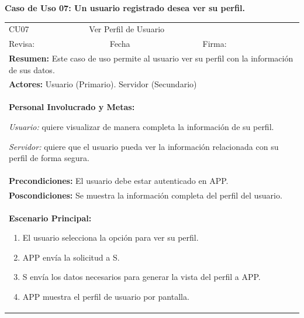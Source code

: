 		\textbf{Caso de Uso 07: Un usuario registrado desea ver su perfil.}
			\begin{longtable}{|l|p{5.5cm}|l|p{2cm}|l|p{1.9cm}|} \hline
				\cellcolor{grisOscuro} CU07 & \multicolumn{4}{|l|}{  \cellcolor{grisOscuro} Ver Perfil de Usuario} &  \cellcolor{grisClaro}\multirow{2}{1cm}{} \\ \cline{1-5}
				\cellcolor{grisOscuro} Revisa: &  \cellcolor{grisClaro} &  \cellcolor{grisOscuro} Fecha &  \cellcolor{grisClaro} &  \cellcolor{grisOscuro} Firma: & \cellcolor{grisClaro} \\ \hline
				\multicolumn{6}{|p{15cm}|}{ \textbf{Resumen: } Este caso de uso permite al usuario ver su perfil con la información de sus datos.

				} \\ \hline

				\multicolumn{6}{|p{15cm}|}{ \textbf{Actores: } Usuario (Primario). Servidor (Secundario)

				} \\ \hline

				\multicolumn{6}{|p{15cm}|}{ \textbf{Personal Involucrado y Metas: }
				
				\emph{Usuario:} quiere visualizar de manera completa la información de su perfil.

				\emph{Servidor:} quiere que el usuario pueda ver la información relacionada con su perfil de forma segura.

				} \\ \hline

				\multicolumn{6}{|p{15cm}|}{ \textbf{Precondiciones: } El usuario debe estar autenticado en APP.

				} \\ \hline

				\multicolumn{6}{|p{15cm}|}{ \textbf{Poscondiciones: } Se muestra la información completa del perfil del usuario.

				} \\ \hline

				\multicolumn{6}{|p{15cm}|}{ \textbf{Escenario Principal: }

				\begin{enumerate}
					\item El usuario selecciona la opción para ver su perfil.
					\item APP envía la solicitud a S.
					\item S envía los datos necesarios para generar la vista del perfil a APP.
					\item APP muestra el perfil de usuario por pantalla.
				\end{enumerate}

}
\end{longtable}
